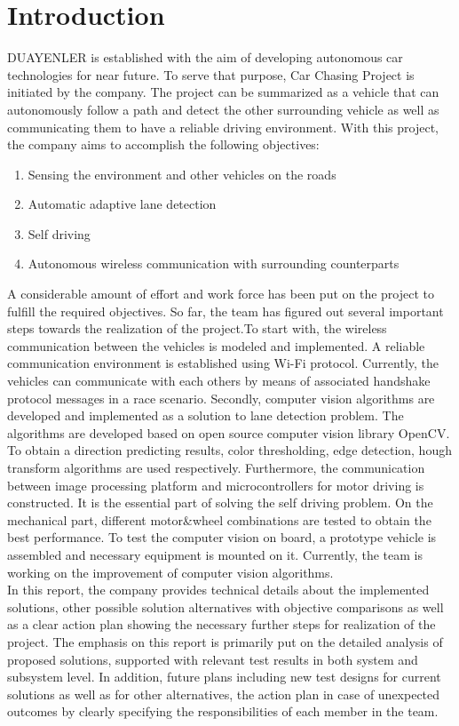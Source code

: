 \documentclass[a4paper,12pt]{article}
\begin{document}
	\section{Introduction}
	DUAYENLER is established with the aim of developing autonomous car technologies for near future. To serve that purpose,  Car Chasing Project is initiated by the company. The project can be summarized as a vehicle that can autonomously follow a path and detect the other surrounding vehicle as well as communicating them to have a reliable driving environment.  With this project, the company aims to accomplish the following objectives:
	\begin{enumerate}
		\item Sensing the environment and other vehicles on the roads
		\item Automatic adaptive lane detection
		\item Self driving
		\item Autonomous wireless communication with surrounding counterparts		
	\end{enumerate}
	
	A considerable amount of effort and work force has been put on the project to fulfill the required objectives. So far, the team has figured out several important steps towards the realization of the project.To start with, the wireless communication between the vehicles is modeled and implemented. A reliable communication environment is established using Wi-Fi protocol. Currently, the vehicles can communicate with each others by means of associated handshake protocol messages in a race scenario. Secondly, computer vision algorithms are developed and implemented as a solution to lane detection problem. The algorithms are developed based on open source computer vision library OpenCV. To obtain a direction predicting results, color thresholding, edge detection, hough transform algorithms are used respectively. Furthermore, the communication between image processing platform and microcontrollers for motor driving is constructed. It is the essential part of solving the self driving problem. On the mechanical part, different motor\&wheel combinations are tested to obtain the best performance. To test the computer vision on board, a prototype vehicle is assembled and necessary equipment is mounted on it. Currently, the team is working on the improvement of computer vision algorithms.\\
	
	In this report, the company provides technical details about the implemented solutions, other possible solution alternatives with objective comparisons as well as a clear action plan showing the necessary further steps for realization of the project. The emphasis on this report is primarily put on the detailed analysis of proposed solutions, supported with relevant test results in both system and subsystem level. In addition, future plans including new test designs for current solutions as well as for other alternatives, the action plan in case of unexpected outcomes by clearly specifying the responsibilities of each member in the team. \\
	
\end{document}
